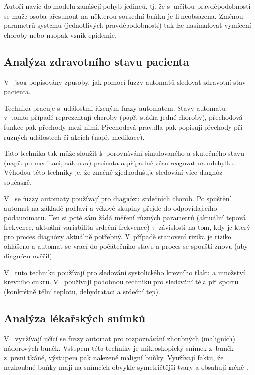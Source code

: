 Autoři navíc do modelu zanášejí pohyb jedinců, tj. že s~určitou pravděpodobností se může osoba přesunout na některou sousední buňku je-li neobsazena. Změnou parametrů systému (jednotlivých pravděpodobností) tak lze nasimulovat vymícení choroby nebo naopak vznik epidemie.

\subsection{Analýza zdravotního stavu pacienta}
V~\cite{Jia+-ExHeaSimMetBasIntHumTheMod, GupRah-CliMonUsFuzSys, CamMerNun-UsFuzAutDiagPrHeaPro, SteAdl-CliMonFuzAut} jsou popisovány způsoby, jak pomocí fuzzy automatů sledovat zdravotní stav pacienta. 

Technika pracuje s~událostmi řízeným fuzzy automatem. Stavy automatu v~tomto případě reprezentují choroby (popř. stádia jedné choroby), přechodová funkce pak přechody mezi nimi. Přechodová pravidla pak popisují přechody při různých událostech či akcích (např. medikace). 

Tato technika tak může sloužit k~porovnávání simulovaného a skutečného stavu (např. po medikaci, zákroku) pacienta a případně včas reagovat na odchylku. Výhodou této techniky je, že značně zjednodušuje sledování více diagnóz současně.

V~\cite{CamMerNun-UsFuzAutDiagPrHeaPro} se fuzzy automaty používají pro diagnózu srdečních chorob. Po spuštění automat na základě pohlaví a věkové skupiny přejde do odpovídajícího podautomatu. Ten si poté sám žádá měření různých parametrů (aktuální tepová frekvence, aktuální variabilita srdeční frekvence) v~závislosti na tom, kdy je který pro proces diagnózy aktuálně potřebný. V~případě stanovení rizika je riziko ohlášeno a automat se vrací do počátečního stavu a proces se spouští znovu (aby diagnózu ověřil). 

V~\cite{GupRah-CliMonUsFuzSys} tuto techniku používají pro sledování systolického krevního tlaku a množství krevního cukru. V~\cite{Jia+-ExHeaSimMetBasIntHumTheMod} používají podobnou techniku pro sledování těla při sportu (konkrétně tělní teplotu, dehydrataci a srdeční tep).


\subsection{Analýza lékařských snímků} \label{subs:MedImgs}
V~\cite{Est+-CytImAnaGenFuFiStMa} využívají učící se fuzzy automat pro rozpoznávání zhoubných (maligních) nádorových buněk. Vstupem této techniky je mikroskopický snímek z~buněk z~prsní tkáně, výstupem pak nalezené maligní buňky. Využívají faktu, že nezhoubné buňky mají na snímcích obvykle symetričtější tvary a obsahují méně .


